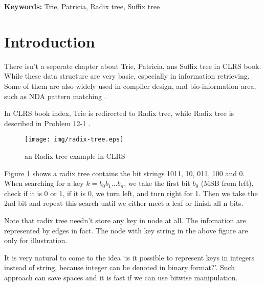 \documentclass{article}
\begin{document}
\vspace{3cm}
{\bfseries Keywords:} Trie, Patricia, Radix tree, Suffix tree


\maketitle

\section{Introduction}
\label{introduction}

There isn't a seperate chapter about Trie, Patricia, ans Suffix tree
in CLRS book. While these data structure are very basic, especially in
information retrieving. Some of them are also widely used in
compiler design\cite{okasaki-int-map}, and bio-information area, such as
NDA pattern matching \cite{wiki-suffix-tree}.

In CLRS book index, Trie is redirected to Radix tree, while Radix tree
is described in Problem 12-1 \cite{CLRS}.

\begin{figure}[htbp]
       \begin{center}
	\texttt{[image: img/radix-tree.eps]}
        \caption{an Radix tree example in CLRS} \label{fig:radix-tree}
       \end{center}
\end{figure}

Figure \ref{fig:radix-tree} shows a radix tree contains the bit
strings 1011, 10, 011, 100 and 0. When searching for a key $k=b_0b_1...b_n$, we
take the first bit $b_0$ (MSB from left), check if it is 0 or 1, if it
is 0, we turn left, and turn right for 1. Then we take the 2nd bit and
repeat this search until we either meet a leaf or finish all n bits.

Note that radix tree needn't store any key in node at all. The
infomation are represented by edges in fact. The node with key string
in the above figure are only for illustration.

It is very natural to come to the idea `is it possible to represent
keys in integers instead of string, because integer can be denoted in
binary format?'. Such approach can save spaces and it is fast if we
can use bitwise manipulation.
\end{document}
